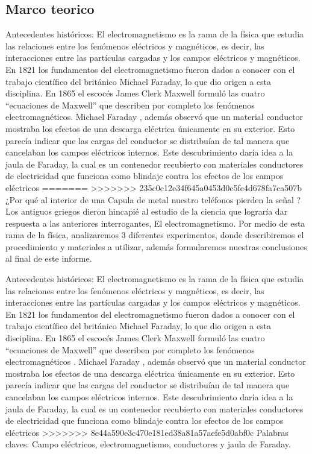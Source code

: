 \documentclass[a4paper, 12p]{article}
\begin{document}
\begin{multicols*}{2}
\section*{Marco teorico}
Antecedentes históricos:
El electromagnetismo es la rama de la física que estudia las relaciones entre los fenómenos eléctricos y magnéticos, es decir, las interacciones entre las partículas cargadas y los campos eléctricos y magnéticos.
En 1821 los fundamentos del electromagnetismo fueron dados a conocer con el trabajo científico del británico Michael Faraday, lo que dio origen a esta disciplina. En 1865 el escocés James Clerk Maxwell formuló las cuatro “ecuaciones de Maxwell” que describen por completo los fenómenos electromagnéticos.
Michael Faraday , además  observó que un material conductor mostraba los efectos de una descarga eléctrica únicamente en su exterior. Esto parecía indicar que las cargas del conductor se distribuían de tal manera que cancelaban los campos eléctricos internos.
Este descubrimiento daría idea a la jaula de Faraday, la cual es un contenedor recubierto con materiales conductores de electricidad que funciona como blindaje contra los efectos de los campos eléctricos
=======
>>>>>>> 235c0c12e34f645a0453d0c5fe4d678fa7ca507b
¿Por qué al interior de una Capula de metal nuestro teléfonos pierden la señal ?
Los antiguos griegos dieron hincapié al estudio de la ciencia que 
lograría dar respuesta a las anteriores interrogantes, El electromagnetismo.
Por medio de esta rama de la física, analizaremos 3 diferentes experimentos, donde describiremos el procedimiento y materiales a utilizar, además   formularemos nuestras conclusiones al final de este informe.

%

Antecedentes históricos:
El electromagnetismo es la rama de la física que estudia las relaciones entre los fenómenos eléctricos y magnéticos, es decir, las interacciones entre las partículas cargadas y los campos eléctricos y magnéticos.
En 1821 los fundamentos del electromagnetismo fueron dados a conocer con el trabajo científico del británico Michael Faraday, lo que dio origen a esta disciplina. En 1865 el escocés James Clerk Maxwell formuló las cuatro “ecuaciones de Maxwell” que describen por completo los fenómenos electromagnéticos \cite{electromagnetismo}.
Michael Faraday , además  observó que un material conductor mostraba los efectos de una descarga eléctrica únicamente en su exterior. Esto parecía indicar que las cargas del conductor se distribuían de tal manera que cancelaban los campos eléctricos internos.
Este descubrimiento daría idea a la jaula de Faraday, la cual es un contenedor recubierto con materiales conductores de electricidad que funciona como blindaje contra los efectos de los campos eléctricos \cite{Jaula de Faraday}
>>>>>>> 8e44a590e3c470e181ed38a81a57aefe5d0abf0c
Palabras claves: Campo eléctricos, electromagnetismo, conductores y jaula de Faraday. 



\end{multicols*}
\end{document}
